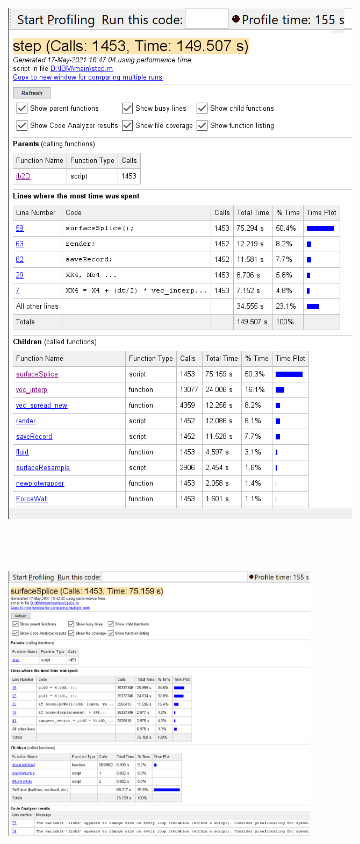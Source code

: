\documentclass{jfm}
\begin{document}
\begin{figure}
        \begin{subfigure}{.5\textwidth}
        \centering
        \includegraphics[width=\textwidth,trim={0mm 0mm 0mm 0mm},clip]{figs/time_profiling/step.png}
        \end{subfigure}
        \\
        \begin{subfigure}{.36\textwidth}
        \centering
        \includegraphics[width=8cm,trim={0mm 0mm 0mm 0mm},clip]{figs/time_profiling/surfaceSplice.png}

\end{subfigure}
\end{figure}
\end{document}
